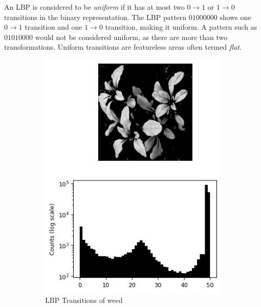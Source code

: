\documentclass[letterpaper]{report}
\begin{document}
An LBP is considered to be \textit{uniform} if it has at most two $0 \rightarrow 1$ or $1 \rightarrow 0$ transitions in the binary representation. The LBP pattern $01000000$ shows one $0 \rightarrow 1$ transition and one $1 \rightarrow 0$ transition, making it uniform. A pattern such as $01010000$ would not be considered uniform, as there are more than two transformations. Uniform transitions are featureless areas often termed \textit{flat}.

%

\begin{figure}[H]
	\centering
	\begin{subfigure}{0.48\linewidth}
		\centering
		\includegraphics[scale=.5]{./figures/lbp-left.jpg}
		\caption{LBP Transitions of weed}
		\label{subfig:lbp-weed}	
	\end{subfigure}
	\hfill
	\begin{subfigure}{0.48\linewidth}
		\centering

\end{subfigure}
\end{figure}
\end{document}
